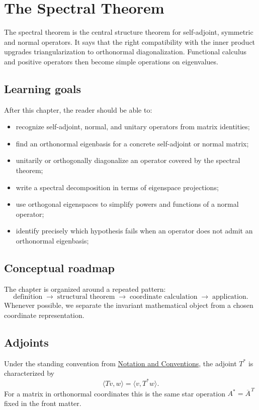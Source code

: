 \chapter{The Spectral Theorem}
\label{ch:i16-the-spectral-theorem}

The spectral theorem is the central structure theorem for self-adjoint, symmetric and normal operators. It says that the right compatibility with the inner product upgrades triangularization to orthonormal diagonalization. Functional calculus and positive operators then become simple operations on eigenvalues.

\section*{Learning goals}
After this chapter, the reader should be able to:
\begin{itemize}
\item recognize self-adjoint, normal, and unitary operators from matrix identities;
\item find an orthonormal eigenbasis for a concrete self-adjoint or normal matrix;
\item unitarily or orthogonally diagonalize an operator covered by the spectral theorem;
\item write a spectral decomposition in terms of eigenspace projections;
\item use orthogonal eigenspaces to simplify powers and functions of a normal operator;
\item identify precisely which hypothesis fails when an operator does not admit an orthonormal eigenbasis;
\end{itemize}
\section*{Conceptual roadmap}
The chapter is organized around a repeated pattern:
\[
\boxed{\text{definition}\;\longrightarrow\;\text{structural theorem}\;\longrightarrow\;\text{coordinate calculation}\;\longrightarrow\;\text{application}.}
\]
Whenever possible, we separate the invariant mathematical object from a chosen coordinate representation.

\section{Adjoints}
Under the standing convention from
\hyperref[sec:i-notation-and-conventions]{Notation and Conventions}, the
adjoint \(T^*\) is characterized by
\[
\langle Tv,w\rangle=\langle v,T^*w\rangle.
\]
For a matrix in orthonormal coordinates this is the same star operation
\(A^*=\overline A^{\,T}\) fixed in the front matter.

